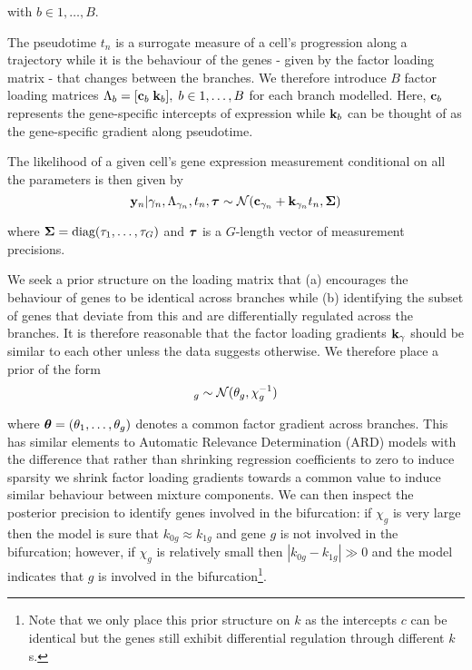with $b \in 1,\ldots,B$.

The pseudotime $t_n$ is a surrogate measure of a cell's progression along a trajectory while it is the behaviour of the genes - given by the factor loading matrix - that changes between the branches. We therefore introduce $B$ factor loading matrices $\Lambda_b = [ {\bf c}_b \; {\bf k}_b], \; b \in 1, \ldots, B$ for each branch modelled. Here, ${\bf c}_b$ represents the gene-specific intercepts of expression while ${\bf k}_b$ can be thought of as the gene-specific gradient along pseudotime.


The likelihood of a given cell's gene expression measurement conditional on all the parameters is then given by %
\begin{equation}
{\bf y}_n | \gamma_n, \Lambda_{\gamma_n}, t_n, {\bm \tau}  \sim \mathcal{N}({\bf c}_{\gamma_n} + {\bf k}_{\gamma_n} t_n, \bm{\Sigma})
\end{equation}

where $\bm{\Sigma} = \text{diag}(\tau_1, \ldots, \tau_G)$ and ${\bm \tau}$ is a $G$-length vector of measurement precisions.

We seek a prior structure on the loading matrix that (a) encourages the behaviour of genes to be identical across branches while (b) identifying the subset of genes that deviate from this and are differentially regulated across the branches. It is therefore reasonable that the factor loading gradients ${\bf k}_\gamma$ should be similar to each other unless the data suggests otherwise. We therefore place a prior of the form
\begin{equation}
[\kgi]_g \sim \norm(\theta_g,  \chi^{-1}_g)
\end{equation}

where $\bm{\theta} = (\theta_1, \ldots, \theta_g)$ denotes a common factor gradient across branches. This has similar elements to Automatic Relevance Determination (ARD) models %
with the difference that rather than shrinking regression coefficients to zero to induce sparsity we shrink factor loading gradients towards a common value to induce similar behaviour between mixture components. We can then inspect the posterior precision %
to identify genes involved in the bifurcation: if $\chi_g$ is very large then the model is sure that $k_{0g} \approx k_{1g}$ and gene $g$ is not involved in the bifurcation; however, if $\chi_g$ is relatively small then $|k_{0g} - k_{1g}| \gg 0$ and the model indicates that $g$ is involved in the bifurcation\footnote{Note that we only place this prior structure on $k$ as the intercepts $c$ can be identical but the genes still exhibit differential regulation through different $k$s.}.

